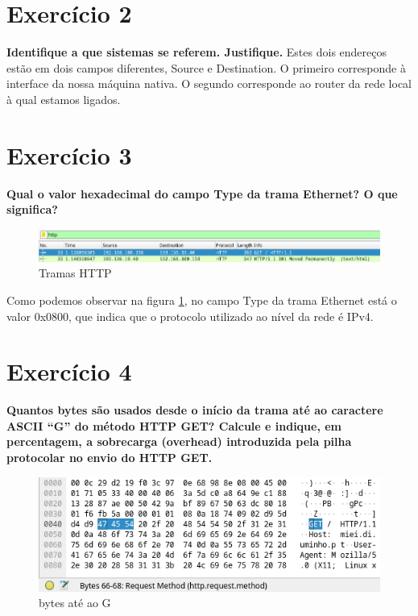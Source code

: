 \documentclass[a4paper]{report}
\begin{document}
\section{Exercício 2}
\textbf{Identifique a que sistemas se referem. Justifique.}
Estes dois endereços estão em dois campos diferentes, Source e Destination.
O primeiro corresponde à interface da nossa máquina nativa. O segundo corresponde
ao router da rede local à qual estamos ligados.

\section{Exercício 3}
\textbf{Qual o valor hexadecimal do campo Type da trama Ethernet? O que
significa?}

\begin{figure}[H]
    \centering 
    \includegraphics[width=\textwidth]{images/tramasHttp.png}  
    \caption{Tramas HTTP}
    \label{fig:tramasHttp}
\end{figure}

Como podemos observar na figura \ref{fig:tramasHttp}, no campo Type da trama Ethernet
está o valor 0x0800, que indica que o protocolo utilizado ao nível da rede é IPv4.

\section{Exercício 4}
\textbf{Quantos bytes são usados desde o início da trama até ao caractere ASCII
“G” do método HTTP GET? Calcule e indique, em percentagem, a sobrecarga
(overhead) introduzida pela pilha protocolar no envio do HTTP GET.}

\begin{figure}[H]
    \centering 
    \includegraphics[width=\textwidth]{images/bytes2G.png}
    \caption{bytes até ao G}
    \label{fig:bytes2G}
\end{figure}
\end{document}
